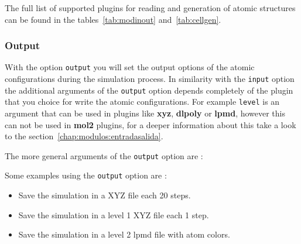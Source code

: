 The full list of supported plugins for reading and generation of atomic
structures can be found in the tables~\ref{tab:modinout} and~\ref{tab:cellgen}.

\subsubsection{Output}

With the option \verb|output| you will set the output options of the atomic
configurations during the simulation process. In similarity with the
\verb|input| option the additional arguments of the \verb|output| option
depends completely of the plugin that you choice for write the atomic
configurations. For example \verb|level| is an argument that can be used in
plugins like \textbf{xyz}, \textbf{dlpoly} or \textbf{lpmd}, however this can
not be used in \textbf{mol2} plugins, for a deeper information about this take
a look to the section~\ref{chap:modulos:entradasalida}. 

The more general arguments of the \verb|output| option are :


Some examples using the \verb|output| option are :

\begin{itemize}
 \item Save the simulation in a XYZ file each 20 steps.
 \item Save the simulation in a level 1 XYZ file each 1 step.
 \item Save the simulation in a level 2 lpmd file with atom colors.
\end{itemize}

